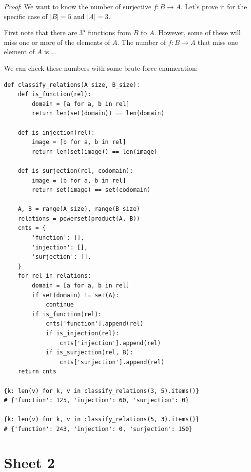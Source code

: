 \documentclass[12pt]{article}
\begin{document}
\begin{mdframed}
\begin{enumerate}[label=(\roman*)]
  \textit{Proof}: We want to know the number of surjective $f:B \to A$. Let's
  prove it for the specific case of $|B| = 5$ and $|A| = 3$.

  First note that there are $3^5$ functions from $B$ to $A$. However, some of
  these will miss one or more of the elements of $A$. The number of
  $f: B \to A$ that miss one element of $A$ is ... 

\end{enumerate}

We can check these numbers with some brute-force enumeration:

\begin{verbatim}
def classify_relations(A_size, B_size):
    def is_function(rel):
        domain = [a for a, b in rel]
        return len(set(domain)) == len(domain)

    def is_injection(rel):
        image = [b for a, b in rel]
        return len(set(image)) == len(image)

    def is_surjection(rel, codomain):
        image = [b for a, b in rel]
        return set(image) == set(codomain)

    A, B = range(A_size), range(B_size)
    relations = powerset(product(A, B))
    cnts = {
        'function': [],
        'injection': [],
        'surjection': [],
    }
    for rel in relations:
        domain = [a for a, b in rel]
        if set(domain) != set(A):
            continue
        if is_function(rel):
            cnts['function'].append(rel)
            if is_injection(rel):
                cnts['injection'].append(rel)
            if is_surjection(rel, B):
                cnts['surjection'].append(rel)
    return cnts

{k: len(v) for k, v in classify_relations(3, 5).items()}
# {'function': 125, 'injection': 60, 'surjection': 0}

{k: len(v) for k, v in classify_relations(5, 3).items()}
# {'function': 243, 'injection': 0, 'surjection': 150}
\end{verbatim}

\end{mdframed}

\newpage
\section*{Sheet 2}
\end{document}
